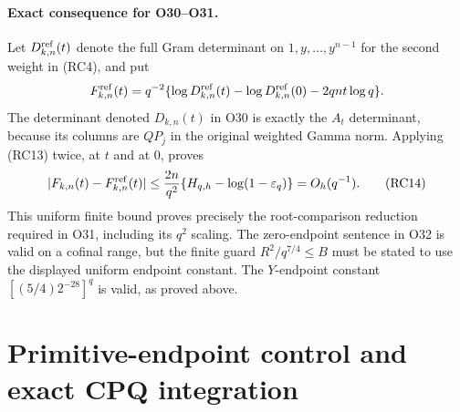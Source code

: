 \paragraph{Exact consequence for O30--O31.}
Let $D^{\rm ref}_{k,n}(t)$ denote the full Gram determinant on
$1,y,\ldots,y^{n-1}$ for the second weight in (RC4), and put
\[
 F^{\rm ref}_{k,n}(t)=q^{-2}
  \{\log D^{\rm ref}_{k,n}(t)-\log D^{\rm ref}_{k,n}(0)
                                   -2qnt\log q\}.
\]
The determinant denoted $D_{k,n}(t)$ in O30 is exactly the
$A_t$ determinant, because its columns are $QP_j$ in the original
weighted Gamma norm.
Applying (RC13) twice, at $t$ and at $0$, proves
\[
 |F_{k,n}(t)-F^{\rm ref}_{k,n}(t)|
 \leq\frac{2n}{q^2}
          \{H_{q,h}-\log(1-\varepsilon_q)\}
 =O_h(q^{-1}).                                  \tag{RC14}
\]
This uniform finite bound proves precisely the root-comparison
reduction required in O31, including its $q^2$ scaling.
The zero-endpoint sentence in O32 is valid on a cofinal range, but the
finite guard $R^2/q^{7/4}\leq B$ must be stated to use the displayed
uniform endpoint constant. The $Y$-endpoint constant
$[(5/4)2^{-28}]^q$ is valid, as proved above.



\endgroup

\clearpage
\begingroup
\def\im{\operatorname{im}}
\def\diag{\operatorname{diag}}
\def\Gr{\operatorname{Gram}}
\def\C{\mathbb C}

\setcounter{equation}{0}
\renewcommand{\theequation}{PEQ\arabic{equation}}
\section*{Primitive-endpoint control and exact CPQ integration}


\begin{abstract}
The original PRT comparison between primitive endpoints has three quotient directions. Its preceding finite estimate had logarithmic width $O(q\log a)$. The original full-remainder AKS estimate and the supplied LRC conductor bounds imply a native Loewner growth bound of width $O_{\rm actual}(q)$ before any fixed flag restriction or attained quotient. The three original PRT returns are therefore $O(q)$, as is the difference of the original common losses. In particular the primitive-endpoint difference has zero $q\log a$ coefficient, with an $O(q)$ remainder, on every retained rank stratum. This resolves that specific logarithmic ambiguity. It does not evaluate either absolute directional allocation, the independent proper-source standard return, or the retained-class projected signs; the requested directional completion target remains open.
\end{abstract}

